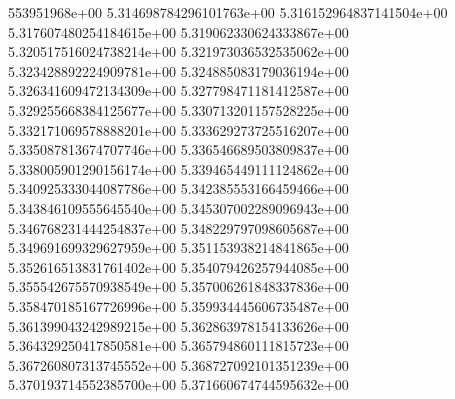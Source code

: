 553951968e+00	5.314698784296101763e+00	5.316152964837141504e+00	5.317607480254184615e+00	5.319062330624333867e+00	5.320517516024738214e+00	5.321973036532535062e+00	5.323428892224909781e+00	5.324885083179036194e+00	5.326341609472134309e+00	5.327798471181412587e+00	5.329255668384125677e+00	5.330713201157528225e+00	5.332171069578888201e+00	5.333629273725516207e+00	5.335087813674707746e+00	5.336546689503809837e+00	5.338005901290156174e+00	5.339465449111124862e+00	5.340925333044087786e+00	5.342385553166459466e+00	5.343846109555645540e+00	5.345307002289096943e+00	5.346768231444254837e+00	5.348229797098605687e+00	5.349691699329627959e+00	5.351153938214841865e+00	5.352616513831761402e+00	5.354079426257944085e+00	5.355542675570938549e+00	5.357006261848337836e+00	5.358470185167726996e+00	5.359934445606735487e+00	5.361399043242989215e+00	5.362863978154133626e+00	5.364329250417850581e+00	5.365794860111815723e+00	5.367260807313745552e+00	5.368727092101351239e+00	5.370193714552385700e+00	5.371660674744595632e+00
